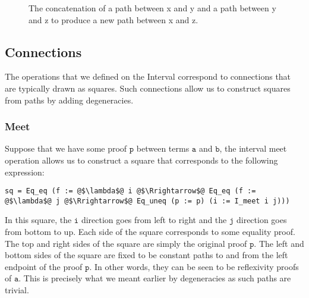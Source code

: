 \documentclass[12pt,twoside,maitrise]{dms}
\theoremstyle{definition}
\numberwithin{equation}{section}
\numberwithin{table}{chapter}
\numberwithin{figure}{chapter}
\newcommand\fn[1] {\texttt{#1}}
\begin{document}
\begin{figure}[H]

\caption{The concatenation of a path between x and y and a path between y and z to produce a new path between x and z.}
\end{figure}

\subsection*{Connections}\label{subsec:interval-connections}

The operations that we defined on the Interval correspond to
connections\cite{cohen2016cubical} that are typically drawn as squares. Such
connections allow us to construct squares from paths by adding degeneracies.

\subsubsection*{Meet}

Suppose that we have some proof $\fn{p}$ between terms $\fn{a}$ and $\fn{b}$,
the interval meet operation allows us to construct a square that corresponds to
the following expression:

\begin{verbatim}
sq = Eq_eq (f := @$\lambda$@ i @$\Rrightarrow$@ Eq_eq (f := @$\lambda$@ j @$\Rrightarrow$@ Eq_uneq (p := p) (i := I_meet i j)))
\end{verbatim}

In this square, the $\fn{i}$ direction goes from left to right and the
$\fn{j}$ direction goes from bottom to up. Each side of the square corresponds
to some equality proof. The top and right sides of the square are simply the
original proof $\fn{p}$. The left and bottom sides of the square are fixed to be
constant paths to and from the left endpoint of the proof $\fn{p}$. In other
words, they can be seen to be reflexivity proofs of $\fn{a}$. This is precisely
what we meant earlier by degeneracies as such paths are trivial.
\end{document}
